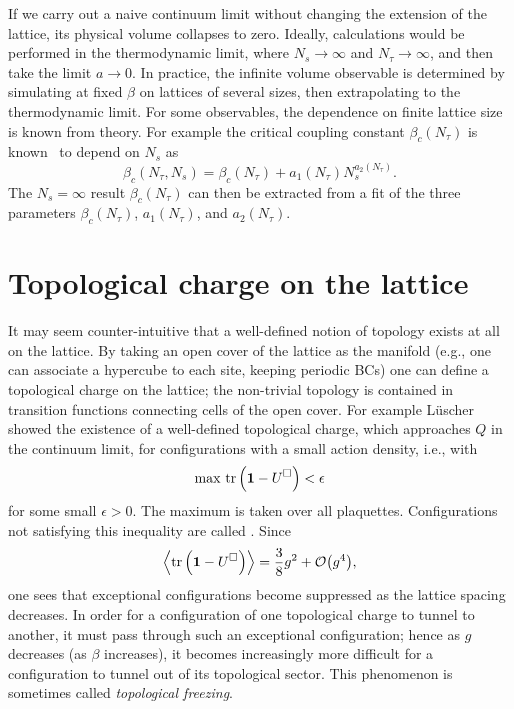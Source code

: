 If we carry out a naive continuum limit without changing the
extension of the lattice, its physical volume collapses to zero.
Ideally, calculations would be performed 
in 
the thermodynamic limit,
where $N_s\to\infty$ and $N_\tau\to\infty$, and then take the limit
$a\to0$. In practice, the infinite volume observable is determined
by simulating at fixed $\beta$ on lattices of several sizes, then
extrapolating to the thermodynamic limit.
For some observables, the dependence on finite lattice size is known
from theory. For example the critical coupling constant $\beta_c(N_\tau)$
is known~\cite{engels_critical_1996} to depend on $N_s$ as
\begin{equation}
  \beta_c(N_\tau,N_s)=\beta_c(N_\tau)+a_1(N_\tau)N_s^{a_2(N_\tau)}.
\end{equation}
The $N_s=\infty$ result $\beta_c(N_\tau)$ can then
be extracted from a fit of the three parameters $\beta_c(N_\tau)$,
$a_1(N_\tau)$, and $a_2(N_\tau)$.


\section{Topological charge on the lattice}\label{sec:toplat}

It may seem counter-intuitive that a well-defined notion of topology
exists at all on the lattice. By taking an open cover of the
lattice as the manifold (e.g., one can associate a hypercube to
each site, keeping periodic BCs) one can define a topological charge on the 
lattice; the non-trivial topology is contained in transition functions
connecting cells of the open cover. For example 
L\"uscher~\cite{luscher_topology_1982} showed
the existence of a well-defined topological charge, which approaches 
$Q$ in the continuum limit, for configurations with a small action
density, i.e., with
\begin{equation}
  \max\,\tr\left({\mathbf 1}-U^\Box\right)<\epsilon
\end{equation}
for some small $\epsilon>0$. The maximum is taken over all plaquettes.
Configurations not satisfying this inequality are called 
. 
Since
\begin{equation}
  \ev{\tr\left(\id-U^\Box\right)}=\frac{3}{8}g^2+\order{g^4},
\end{equation} 
one sees that exceptional configurations become suppressed 
as the lattice spacing
decreases. In order for a configuration of one topological charge to
tunnel to another, it must pass through such an exceptional configuration;
hence as $g$ decreases (as $\beta$ increases), it becomes increasingly 
more difficult for a configuration to tunnel out of its topological sector. 
This phenomenon is sometimes called {\it topological freezing}.


